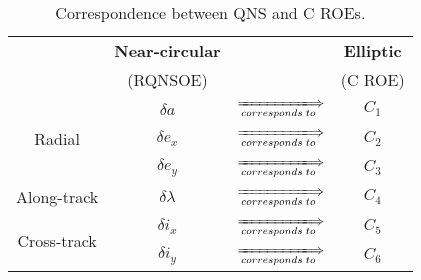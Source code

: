 \begin{table}[!htb]
\begin{center}
\begin{tabular}{c|ccc}
\hline 
\hline
\rowcolor{Gray!30}
		& \textbf{Near-circular}	& 	\vline	& \textbf{Elliptic} \\
\rowcolor{Gray!30}
		& (RQNSOE)				& 	\vline	& (C ROE) \\[1em]
\hline 
\hline 
							& $\delta a$ 		& $\xLongrightarrow[\tiny{corresponds\; to}]{}$ & $C_1$ \\[1em]
\centering Radial 			& $\delta e_x$		& $\xLongrightarrow[\tiny{corresponds\; to}]{}$ & $C_2$ \\[1em]
							& $\delta e_y$		& $\xLongrightarrow[\tiny{corresponds\; to}]{}$ & $C_3$ \\[1em]
\hline
\centering Along-track 					& $\delta \lambda$	& $\xLongrightarrow[\tiny{corresponds\; to}]{}$ & $C_4$ \\[1em]
\hline
\multirow{3}{*}{Cross-track}	& $\delta i_x$ 		& $\xLongrightarrow[\tiny{corresponds\; to}]{}$ & $C_5$ \\[1em] 
							& $\delta i_y$		& $\xLongrightarrow[\tiny{corresponds\; to}]{}$ & $C_6$ \\[1em]
\hline
\hline 
\end{tabular} 
\end{center}
\caption{Correspondence between QNS and C ROEs.}
\label{tabCh3:QNS_C_correspondence}
\end{table}
%
\FloatBarrier
%
